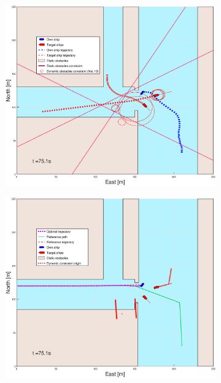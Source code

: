 \begin{figure}[ht]
\begin{subfigure}[b]{0.499\textwidth}
    \end{subfigure}
    \hfill
    \\
    \begin{subfigure}[b]{0.49\textwidth}
        \centering
        \includegraphics[width=\textwidth]{Images/Figures/Havn1/_Simple_0fig1_time=75}
    \end{subfigure}
    \hfill
    \begin{subfigure}[b]{0.499\textwidth}
        \centering
        \includegraphics[width=\textwidth]{Images/Figures/Havn1/_Simple_0fig999_time=75}

\end{subfigure}
\end{figure}
